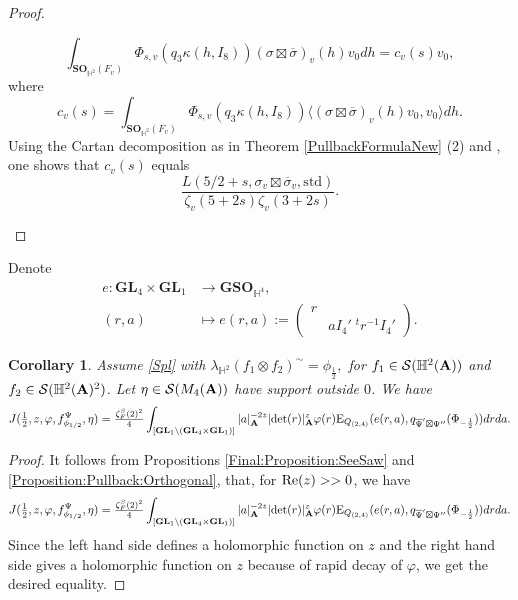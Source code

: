 \documentclass[11pt, reqno]{amsart}
\theoremstyle{plain}
\newtheorem{corollary}[theorem]{Corollary}
\theoremstyle{definition}
\theoremstyle{remark}
\theoremstyle{plain}
\def\A{{\bf A}}
\def\det{\mathrm{det}}
\def\GL{\mathbf{GL}}
\begin{document}
\begin{proof}
\begin{enumerate}
        \[\int_{\mathbf{SO}_{\mathbb{H}^2}(F_v)}\Phi_{s,v}(q_3\kappa(h,I_8))(\sigma\boxtimes\overline{\sigma})_v(h)v_0dh = c_v(s)v_0,\]
        where
        \[c_v(s) = \int_{\mathbf{SO}_{\mathbb{H}^2}(F_v)}\Phi_{s,v}(q_3\kappa(h,I_8))\langle(\sigma\boxtimes\overline{\sigma})_v(h)v_0,v_0\rangle dh.\]
        Using the Cartan decomposition as in Theorem \ref{PullbackFormulaNew} (2) and \cite[Proposition 6.4 (a) \& Proof of Theorem 6.1]{ExplicitGSR}, one shows that $c_v(s)$ equals $$\frac{L(5/2+s,\sigma_v\boxtimes\overline{\sigma}_v,\mathrm{std})}{\zeta_v(5+2s)\zeta_v(3+2s)}. $$ 
    \end{enumerate}
    
   
\end{proof}

Denote
\begin{align}\label{embedding:e} e:\GL_4 \times \GL_1 &\to \mathbf{GSO}_{\mathbb{H}^4},\\ (r,a)&\mapsto e(r,a) := \left(\begin{smallmatrix}r & \\ &aI_4'\;^{t}r^{-1}I_4'\end{smallmatrix}\right).\nonumber\end{align}

\begin{corollary}\label{Corollary:Pullback:Orthogonal}
    Assume \eqref{Spl} with $ \lambda_{\mathbb{H}^2}(f_1 \otimes f_2)^{\sim} = \phi_{\frac{1}{2}},$ for $ f_1\in \mathcal{S}(\mathbb{H}^2(\A))$ and $f_2 \in \mathcal{S}(\mathbb{H}^2(\A)^2)$. Let $\eta \in \mathcal{S}(M_4(\A))$ have support outside $0$. We have
\[J(\tfrac{1}{2},z,\varphi,f^\Psi_{\phi_{1/2}}, \eta) = \tfrac{\zeta^S_F(2)^2}{4}\int_{[ \GL_1 \backslash (\GL_4 \times \GL_1)]}|a|_\A^{-2z}|\det(r)|^{z}_{\A}\varphi(r)\mathrm{E}_{Q_{(2,4)}}(e(r,a),q_{\overline{\Psi}'\boxtimes\Psi''}(\Phi_{-\frac{1}{2}})) drda.\]
\end{corollary}
\begin{proof}
    It follows from Propositions \ref{Final:Proposition:SeeSaw} and \ref{Proposition:Pullback:Orthogonal}, that, for ${\rm Re}(z)>>0$, we have
\[J(\tfrac{1}{2},z,\varphi,f^\Psi_{\phi_{1/2}}, \eta) = \tfrac{\zeta^S_F(2)^2}{4}\int_{[ \GL_1 \backslash (\GL_4 \times \GL_1)]}|a|_\A^{-2z}|\det(r)|^{z}_{\A}\varphi(r)\mathrm{E}_{Q_{(2,4)}}(e(r,a),q_{\overline{\Psi}'\boxtimes\Psi''}(\Phi_{-\frac{1}{2}})) drda.\]
Since the left hand side defines a holomorphic function on $z$ and the right hand side gives a holomorphic function on $z$ because of rapid decay of $\varphi$, we get the desired equality.
\end{proof}
\end{document}
